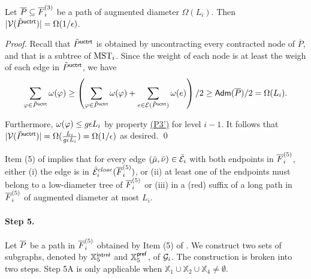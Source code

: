 \begin{lemma}\label{lm:size-MSTsubree} Let $\overline{P} \subseteq \overline{F}^{(3)}_i$ be a path of augmented diameter $\Omega(L_i)$. Then $|\mathcal{V}(\tilde{P}^{\mathsf{uctrt}})| =  \Omega(1/\epsilon)$.
\end{lemma}
\begin{proof}
	Recall that $\tilde{P}^{\mathsf{uctrt}}$ is obtained by uncontracting every contracted node of  $\overline{P}$, and that is a subtree of $\mathrm{MST}_i$. 	
	Since the weight of each node is at least the weigh of each edge in $\tilde{P}^{\mathsf{uctrt}}$, we have
	\begin{equation*}
		\begin{split}
			\sum_{\varphi \in \tilde{P}^{\mathsf{uctrt}}}\omega(\varphi) \geq \left(\sum_{\varphi \in \tilde{P}^{\mathsf{uctrt}}}\omega(\varphi) + \sum_{ e\in \mathcal{E}(\tilde{P}^{\mathsf{uctrt}})} \omega(e)\right)/2 \geq \mathsf{Adm}(\overline{P})/2 = \Omega(L_i).
		\end{split}
	\end{equation*}
	
	Furthermore, $\omega(\varphi) \leq g\epsilon L_i$ by property  \hyperlink{P3'}{(P3')} for level $i-1$. It follows that $|\mathcal{V}(\tilde{P}^{\mathsf{uctrt}})| =\Omega( \frac{L_i}{g\epsilon L_i}) = \Omega(1/\epsilon)$ as desired. \qed
\end{proof}

\begin{remark}\label{remark:Clustering-Step4} Item (5) of  implies that for every edge $(\bar\mu,\bar\nu)\in \bar{\mathcal{E}}_i$ with both endpoints in $\overline{F}^{(5)}_i$, either (i) the edge is in $ \bar{\mathcal{E}}^{close}_i(\overline{F}^{(5)}_i)$, or (ii) at least one of the endpoints must belong to a low-diameter tree of $\overline{F}^{(5)}_i$ or (iii) in a (red) suffix of a long path in $\overline{F}^{(5)}_i$ of augmented diameter at most $L_i$.
\end{remark}



\paragraph{Step 5.~} Let $\overline{P}$ be  a path in  $\overline{F}^{(5)}_i$ obtained by Item (5) of . We construct two sets of subgraphs, denoted by $\mathbb{X}^{\mathsf{intrnl}}_5$ and $\mathbb{X}^{\mathsf{pref}}_5$, of $\mathcal{G}_i$. The construction is broken into two steps. Step 5A is only applicable when $\mathbb{X}_1 \cup \mathbb{X}_2\cup \mathbb{X}_4 \not= \emptyset$.

